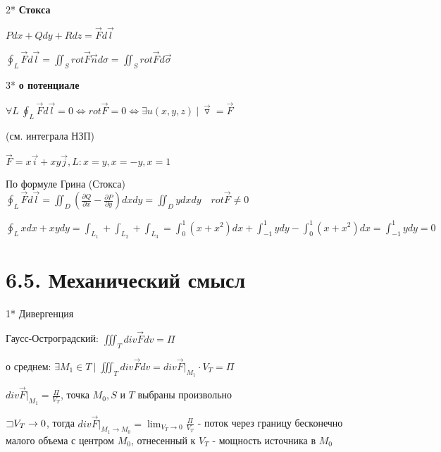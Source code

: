 \documentclass[12pt]{article}
\begin{document}
    2* \textbf{Стокса}

    $Pdx + Qdy + Rdz = \overrightarrow{F}d\overrightarrow{l}$

    $\displaystyle \oint_L \overrightarrow{F}d\overrightarrow{l} = \iint_S rot \overrightarrow{F} \overrightarrow{n} d\sigma = \iint_S rot \overrightarrow{F} d\overrightarrow{\sigma}$

    \vspace{5mm}

    3* \textbf{\Th о потенциале}

    $\displaystyle \forall L \ \oint_L \overrightarrow{F}d\overrightarrow{l} = 0 \Longleftrightarrow rot \overrightarrow{F} = 0 \Longleftrightarrow \exists u(x, y, z) \ | \ \overrightarrow{\triangledown} = \overrightarrow{F}$

    (см. \Ths интеграла НЗП)

    \Ex $\overrightarrow{F} = x\overrightarrow{i} + xy \overrightarrow{j}, L: x = y, x = -y, x = 1$

    По формуле Грина (Стокса) $\displaystyle \oint_L \overrightarrow{F} d\overrightarrow{l} = \iint_{D} (\frac{\partial Q}{\partial x} - \frac{\partial P}{\partial y}) dxdy =
    \iint_D y dxdy \quad rot \overrightarrow{F} \neq 0$

    $\displaystyle \oint_L xdx + xydy = \int_{L_1} + \int_{L_2} + \int_{L_3} = \int_0^1 (x + x^2) dx + \int_{-1}^1 y dy - \int_0^1 (x + x^2) dx = \int_{-1}^1 y dy = 0$

    \section{6.5. Механический смысл}

    1* Дивергенция

    Гаусс-Остроградский: $\displaystyle \iiint_T div \overrightarrow{F} dv = \Pi$

    \Ths о среднем: $\displaystyle \exists M_1 \in T \ | \ \iiint_T div \overrightarrow{F} dv = div \overrightarrow{F} \Big|_{M_1} \cdot V_T = \Pi$

    $\displaystyle div \overrightarrow{F} \Big|_{M_1} = \frac{\Pi}{V_T}$, точка $\displaystyle M_0, S$ и $T$ выбраны произвольно

    $\displaystyle \mathord{\sqsupset} V_T \to 0$, тогда $\displaystyle div \overrightarrow{F} \Big|_{M_1 \to M_0} = \lim_{V_T \to 0} \frac{\Pi}{V_T}$ - поток через границу бесконечно малого объема с центром $\displaystyle M_0$, отнесенный к $\displaystyle V_T$ - мощность источника в $\displaystyle M_0$
\end{document}
